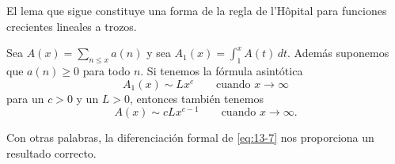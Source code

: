     El lema que sigue constituye una forma de la regla de l'Hôpital para funciones crecientes
    lineales a trozos.

    \begin{lema}\label{lem:13-2}
        Sea $A(x)=\sum_{n\leq x}a(n)$ y sea $A_1(x)=\int_1^xA(t)\,dt$. Además suponemos que
        $a(n)\geq0$ para todo $n$. Si tenemos la fórmula asintótica
        \begin{equation}\label{eq:13-7}
            A_1(x)\sim Lx^c\qquad\text{cuando }x\to\infty
        \end{equation}
        para un $c>0$ y un $L>0$, entonces también tenemos
        \begin{equation}\label{eq:13-8}
            A(x)\sim cLx^{c-1}\qquad\text{cuando }x\to\infty.
        \end{equation}
    \end{lema}

    Con otras palabras, la diferenciación formal de \eqref{eq:13-7} nos proporciona un
    resultado correcto.

